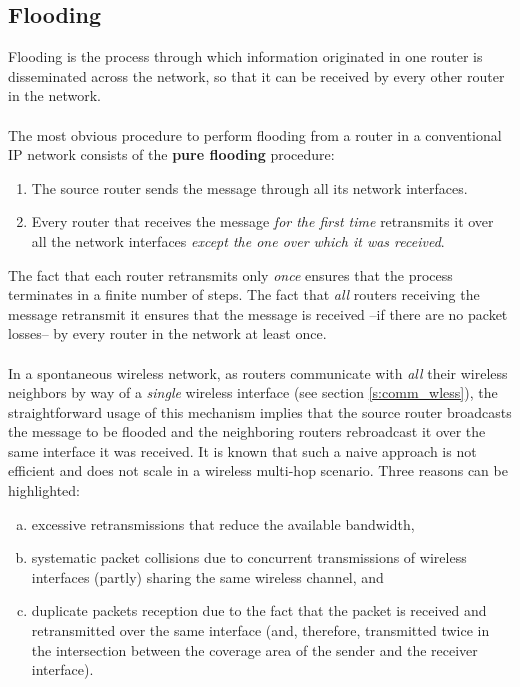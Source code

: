 

\subsection{Flooding}
\label{ss:flood}
%
Flooding is the process through which information originated in one router is disseminated across the network, so that it can be received by every other router in the network. \ \\ \ \\
%
The most obvious procedure to perform flooding from a router in a conventional IP network consists of the {\bf pure flooding} procedure:

\begin{enumerate}
\item The source router sends the message through all its network interfaces.
\item Every router that receives the message {\em for the first time} retransmits it over all the network interfaces {\em except the one over which it was received}.
\end{enumerate}

The fact that each router retransmits only {\em once} ensures that the process terminates in a finite number of steps. The fact that {\em all} routers receiving the message retransmit it ensures that the message is received --if there are no packet losses-- by every router in the network at least once. \ \\ \ \\
%
In a spontaneous wireless network, as routers communicate with {\em all} their wireless neighbors by way of a {\em single} wireless interface (see section \ref{s:comm_wless}), the straightforward usage of this mechanism implies that the source router broadcasts the message to be flooded and the neighboring routers rebroadcast it over the same interface it was received. It is known \cite{broadcaststorm} that such a naive approach is not efficient and does not scale in a wireless multi-hop scenario. Three reasons can be highlighted: 

\begin{enumerate}[a)]
\item excessive retransmissions that reduce the available bandwidth, 
\item systematic packet collisions due to concurrent transmissions of wireless interfaces (partly) sharing the same wireless channel, and 
\item duplicate packets reception due to the fact that the packet is received and retransmitted over the same interface (and, therefore, transmitted twice in the intersection between the coverage area of the sender and the receiver interface). 
\end{enumerate}

